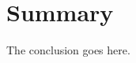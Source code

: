 \documentclass[journal, 10pt]{IEEEtran}
\begin{document}
%


\section{Summary}
The conclusion goes here.



\nocite{*}

{}
\end{document}
